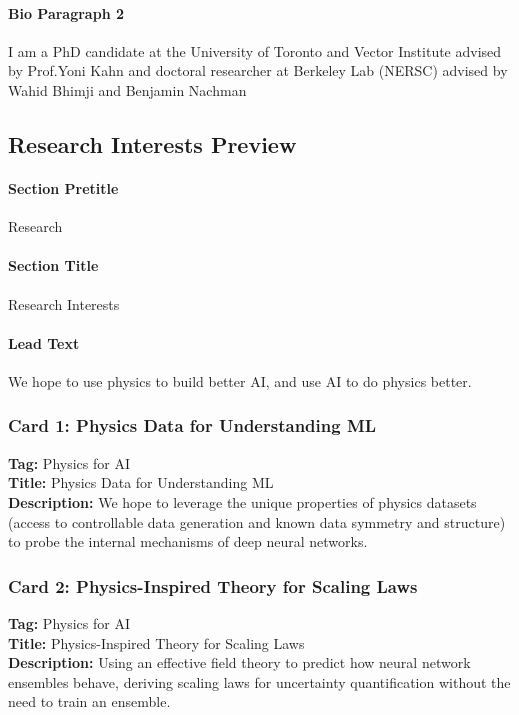 \documentclass[11pt]{article}
\begin{document}
\paragraph{Bio Paragraph 2}
I am a PhD candidate at the University of Toronto and Vector Institute advised by Prof.Yoni Kahn and doctoral researcher at Berkeley Lab (NERSC) advised by Wahid Bhimji and Benjamin Nachman



\subsection{Research Interests Preview}
\label{sec:home-research}

\paragraph{Section Pretitle}
Research

\paragraph{Section Title}
Research Interests

\paragraph{Lead Text}
We hope to use physics to build better AI, and use AI to do physics better.

\subsubsection{Card 1: Physics Data for Understanding ML}
\label{sec:home-card1}
\textbf{Tag:} Physics for AI\\
\textbf{Title:} Physics Data for Understanding ML\\
\textbf{Description:} We hope to leverage the unique properties of physics datasets (access to controllable data generation and known data symmetry and structure) to probe the internal mechanisms of deep neural networks.

\subsubsection{Card 2: Physics-Inspired Theory for Scaling Laws}
\label{sec:home-card2}
\textbf{Tag:} Physics for AI\\
\textbf{Title:} Physics-Inspired Theory for Scaling Laws\\
\textbf{Description:} Using an effective field theory to predict how neural network ensembles behave, deriving scaling laws for uncertainty quantification without the need to train an ensemble.
\end{document}
